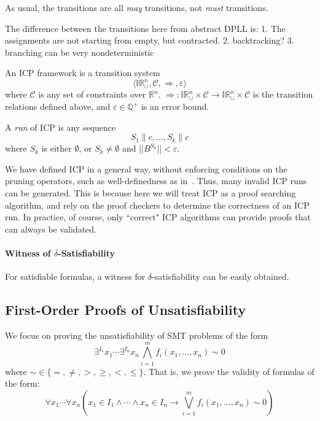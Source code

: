 \documentclass[envcountsect]{llncs}
\begin{document}
As usual, the transitions are all {\em may} transitions, not {\em must}
transitions. 
\begin{remark}
The difference between the transitions here from abstract DPLL is:
1. The assignments are not starting from empty, but contracted.
2. backtracking? 
3. branching can be very nondeterministic
\end{remark}
\begin{definition}
An ICP framework is a transition system 
$$\langle \mathbb{IR}_{\cup}^n, \mathcal{C}, \Longrightarrow,
\varepsilon\rangle$$
where $\mathcal{C}$ is any set of constraints over $\mathbb{R}^n$. 
$\Longrightarrow: \mathbb{IR}_{\cup}^n\times
\mathcal{C}\rightarrow \mathbb{IR}_{\cup}^n\times \mathcal{C}$ is the transition
relations defined above, and $\varepsilon\in \mathbb{Q}^+$ is an
error bound. 

A {\em run} of ICP is any sequence
$$S_1\parallel c, ... , S_k\parallel c$$
where $S_k$ is either $\emptyset$, or $S_k\neq \emptyset$ and
$||B^{S_k}||<\varepsilon$. 
\end{definition}
\begin{remark}
We have defined ICP in a general way, without enforcing conditions
on the pruning operators, such as well-definedness as in~\cite{}. Thus, many
invalid ICP runs can be generated. This is
because here we will treat ICP as a proof searching algorithm, and rely on the
proof checkers to determine the correctness of an ICP run. In practice, of
course, only
``correct" ICP algorithms can provide proofs that can always be validated.    
\end{remark}




\paragraph{Witness of $\delta$-Satisfiability}
For satisfiable formulas, a witness for $\delta$-satisfiability can be
easily obtained. 


\subsection{First-Order Proofs of Unsatisfiability}

We focus on proving the unsatisfiability of SMT problems of the form
$$\exists^{I_1} x_1\cdots \exists^{I_n} x_n \bigwedge_{i=1}^m
f_i(x_1,...,x_n)\sim 0$$
where $\sim \in \{=,\neq, >, \geq, <, \leq\}$. That is, we prove the validity
of formulas of the form:
$$\forall x_1 \cdots \forall x_n (x_1\in I_1\wedge \cdots \wedge x_n\in I_n
\rightarrow \bigvee_{i=1}^m f_i(x_1,...,x_n)\sim 0)$$
\end{document}

